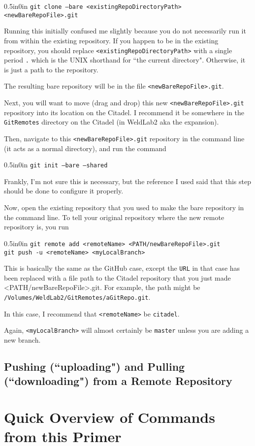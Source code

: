 \documentclass[11pt]{article}
\newcommand{\code}[1]{\begin{adjustwidth}{0.5in}{0in}
    \texttt{#1}
    \end{adjustwidth}}
\begin{document}
\code{git clone --bare <existingRepoDirectoryPath> <newBareRepoFile>.git}

Running this initially confused me slightly because you do not necessarily run it from within the existing repository.  If you happen to be in the existing repository, you should replace \texttt{<existingRepoDirectoryPath>} with a single period \texttt{.} which is the UNIX shorthand for ``the current directory".  Otherwise, it is just a path to the repository.

The resulting bare repository will be in the file \texttt{<newBareRepoFile>.git}.

Next, you will want to move (drag and drop) this new \texttt{<newBareRepoFile>.git} repository into its location on the Citadel.  I recommend it be somewhere in the \texttt{GitRemotes} directory on the Citadel (in WeldLab2 aka the expansion).

Then, navigate to this \texttt{<newBareRepoFile>.git} repository in the command line (it acts as a normal directory), and run the command

\code{git init --bare --shared}

Frankly, I'm not sure this is necessary, but the reference I used said that this step should be done to configure it properly.

Now, open the existing repository that you used to make the bare repository in the command line.  To tell your original repository where the new remote repository is, you run

\code{git remote add <remoteName> <PATH/newBareRepoFile>.git\\
git push -u <remoteName> <myLocalBranch>}  

This is basically the same as the GitHub case, except the \texttt{URL} in that case has been replaced with a file path to the Citadel repository that you just made <PATH/newBareRepoFile>.git.  For example, the path might be \texttt{/Volumes/WeldLab2/GitRemotes/aGitRepo.git}.

In this case, I recommend that \texttt{<remoteName>} be \texttt{citadel}.

Again, \texttt{<myLocalBranch>} will almost certainly be \texttt{master} unless you are adding a new branch.

\subsection{Pushing (``uploading") and Pulling (``downloading") from a Remote Repository}

\section{Quick Overview of Commands from this Primer}
\end{document}
